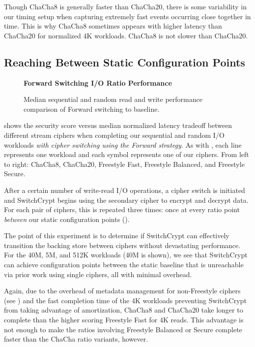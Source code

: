 Though ChaCha8 is generally faster than ChaCha20, there is some variability in
our timing setup when capturing extremely fast events occurring close together
in time. This is why ChaCha8 sometimes appears with higher latency than
ChaCha20 for normalized 4K workloads. ChaCha8 is not slower than ChaCha20.

\subsection{Reaching Between Static Configuration Points}

\begin{figure}[ht]
  \textbf{Forward Switching I/O Ratio Performance}\par\medskip
  {} \caption{Median sequential and
  random read and write performance comparison of Forward switching to
  baseline.}
 \label{fig:tradeoff-with-ratios}
\end{figure}

 shows the security score versus median normalized
latency tradeoff between different stream ciphers when completing our sequential
and random I/O workloads \emph{with cipher switching using the Forward
strategy}. As with , each line represents one
workload and each symbol represents one of our ciphers. From left to right:
ChaCha8, ChaCha20, Freestyle Fast, Freestyle Balanced, and Freestyle Secure.

After a certain number of write-read I/O operations, a cipher switch is
initiated and SwitchCrypt begins using the secondary cipher to encrypt and
decrypt data. For each pair of ciphers, this is repeated three times: once at
every ratio point \emph{between} our static configuration points ().

The point of this experiment is to determine if SwitchCrypt can effectively
transition the backing store between ciphers without devastating performance.
For the 40M, 5M, and 512K workloads (40M is shown), we see that SwitchCrypt can
achieve configuration points between the static baseline that is unreachable via
prior work using single ciphers, all with minimal overhead.

Again, due to the overhead of metadata management for non-Freestyle ciphers (see
) and the fast completion time of the 4K workloads
preventing SwitchCrypt from taking advantage of amortization, ChaCha8 and
ChaCha20 take longer to complete than the higher scoring Freestyle Fast for 4K
reads. This advantage is not enough to make the ratios involving Freestyle
Balanced or Secure complete faster than the ChaCha ratio variants, however.


